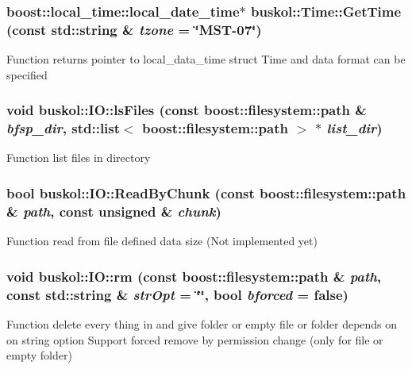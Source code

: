 \hypertarget{group__libbuskol_ga6302b620351164dda28cc6d9d1b81aa5}{
\subsubsection[{GetTime}]{\setlength{\rightskip}{0pt plus 5cm}boost::local\_\-time::local\_\-date\_\-time$\ast$ buskol::Time::GetTime (const std::string \& {\em tzone} = {\ttfamily \char`\"{}MST-\/07\char`\"{}})}}
\label{group__libbuskol_ga6302b620351164dda28cc6d9d1b81aa5}
Function returns pointer to local\_\-data\_\-time struct Time and data format can be specified \hypertarget{group__libbuskol_ga172cf5b6503f899737f413d631a4d6ca}{
\subsubsection[{lsFiles}]{\setlength{\rightskip}{0pt plus 5cm}void buskol::IO::lsFiles (const boost::filesystem::path \& {\em bfsp\_\-dir}, \/  std::list$<$ boost::filesystem::path $>$ $\ast$ {\em list\_\-dir})}}
\label{group__libbuskol_ga172cf5b6503f899737f413d631a4d6ca}
Function list files in directory \hypertarget{group__libbuskol_gac93438593df503ce260ed0a9ec1e5249}{
\subsubsection[{ReadByChunk}]{\setlength{\rightskip}{0pt plus 5cm}bool buskol::IO::ReadByChunk (const boost::filesystem::path \& {\em path}, \/  const unsigned \& {\em chunk})}}
\label{group__libbuskol_gac93438593df503ce260ed0a9ec1e5249}
Function read from file defined data size (Not implemented yet) \hypertarget{group__libbuskol_ga38a9328ed6fbfed356b401e209204da2}{
\subsubsection[{rm}]{\setlength{\rightskip}{0pt plus 5cm}void buskol::IO::rm (const boost::filesystem::path \& {\em path}, \/  const std::string \& {\em strOpt} = {\ttfamily \char`\"{}\char`\"{}}, \/  bool {\em bforced} = {\ttfamily false})}}
\label{group__libbuskol_ga38a9328ed6fbfed356b401e209204da2}
Function delete every thing in and give folder or empty file or folder depends on on string option Support forced remove by permission change (only for file or empty folder) 

